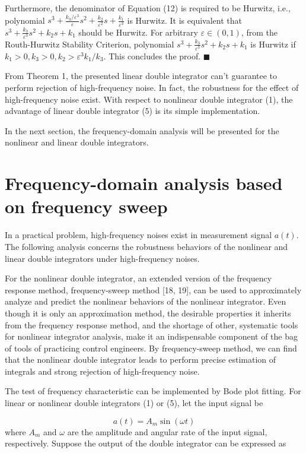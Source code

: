\documentclass[10pt,journal]{IEEEtran}
\begin{document}
Furthermore, the denominator of Equation (12) is required to be Hurwitz,
i.e., polynomial $s^{3}+\frac{k_{3}/\varepsilon ^{3}}{\varepsilon }s^{2}+\frac{k_{2}}{\varepsilon ^{2}}s+\frac{k_{1}}{\varepsilon ^{3}}$ is Hurwitz.
It is equivalent that $s^{3}+\frac{k_{3}}{\varepsilon ^{3}}s^{2}+k_{2}s+k_{1} $ should be Hurwitz. For arbitrary $\varepsilon \in
\left( 0,1\right) $, from the Routh-Hurwitz Stability Criterion, polynomial $s^{3}+\frac{k_{3}}{\varepsilon ^{3}}s^{2}+k_{2}s+k_{1}$ is Hurwitz if $k_{1}>0,k_{3}>0,k_{2}>\varepsilon ^{3}k_{1}/k_{3}$. This concludes the
proof. $\blacksquare $

From Theorem 1, the presented linear double integrator can't guarantee to
perform rejection of high-frequency noise. In fact, the robustness for the
effect of high-frequency noise exist. With respect to nonlinear double
integrator (1), the advantage of linear double integrator (5) is its simple
implementation.

In the next section, the frequency-domain analysis will be presented for the
nonlinear and linear double integrators.

\section{Frequency-domain analysis based on frequency sweep}

In a practical problem, high-frequency noises exist in measurement signal $a(t)$. The following analysis concerns the robustness behaviors of the
nonlinear and linear double integrators under high-frequency noises.

For the nonlinear double integrator, an extended version of the frequency
response method, frequency-sweep method [18, 19], can be used to
approximately analyze and predict the nonlinear behaviors of the nonlinear
integrator. Even though it is only an approximation method, the desirable
properties it inherits from the frequency response method, and the shortage
of other, systematic tools for nonlinear integrator analysis, make it an
indispensable component of the bag of tools of practicing control engineers.
By frequency-sweep method, we can find that the nonlinear double integrator
leads to perform precise estimation of integrals and strong rejection of
high-frequency noise.

The test of frequency characteristic can be implemented by Bode plot
fitting. For linear or nonlinear double integrators (1) or (5), let the
input signal be

\begin{equation}
a(t)=A_{m}\sin (\omega t)
\end{equation}where $A_{m}$ and $\omega $ are the amplitude and angular rate of the input
signal, respectively. Suppose the output of the double integrator can be
expressed as
\end{document}
